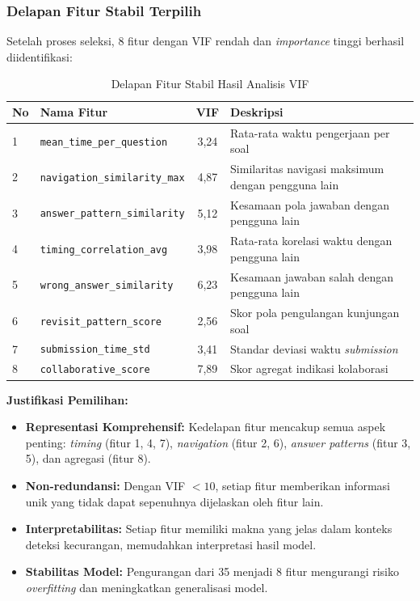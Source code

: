 \subsubsection{Delapan Fitur Stabil Terpilih}
Setelah proses seleksi, 8 fitur dengan VIF rendah dan \textit{importance} tinggi berhasil diidentifikasi:

\begin{table}[htbp]
\centering
\caption{Delapan Fitur Stabil Hasil Analisis VIF}
\label{tabel:fiturStabil}
\begin{tabular}{|l|l|c|p{5cm}|}
\hline
\textbf{No} & \textbf{Nama Fitur} & \textbf{VIF} & \textbf{Deskripsi} \\
\hline
1 & \texttt{mean\_time\_per\_question} & 3,24 & Rata-rata waktu pengerjaan per soal \\
\hline
2 & \texttt{navigation\_similarity\_max} & 4,87 & Similaritas navigasi maksimum dengan pengguna lain \\
\hline
3 & \texttt{answer\_pattern\_similarity} & 5,12 & Kesamaan pola jawaban dengan pengguna lain \\
\hline
4 & \texttt{timing\_correlation\_avg} & 3,98 & Rata-rata korelasi waktu dengan pengguna lain \\
\hline
5 & \texttt{wrong\_answer\_similarity} & 6,23 & Kesamaan jawaban salah dengan pengguna lain \\
\hline
6 & \texttt{revisit\_pattern\_score} & 2,56 & Skor pola pengulangan kunjungan soal \\
\hline
7 & \texttt{submission\_time\_std} & 3,41 & Standar deviasi waktu \textit{submission} \\
\hline
8 & \texttt{collaborative\_score} & 7,89 & Skor agregat indikasi kolaborasi \\
\hline
\end{tabular}
\end{table}

\textbf{Justifikasi Pemilihan:}
\begin{itemize}
    \item \textbf{Representasi Komprehensif:} Kedelapan fitur mencakup semua aspek penting: \textit{timing} (fitur 1, 4, 7), \textit{navigation} (fitur 2, 6), \textit{answer patterns} (fitur 3, 5), dan agregasi (fitur 8).
    \item \textbf{Non-redundansi:} Dengan VIF $< 10$, setiap fitur memberikan informasi unik yang tidak dapat sepenuhnya dijelaskan oleh fitur lain.
    \item \textbf{Interpretabilitas:} Setiap fitur memiliki makna yang jelas dalam konteks deteksi kecurangan, memudahkan interpretasi hasil model.
    \item \textbf{Stabilitas Model:} Pengurangan dari 35 menjadi 8 fitur mengurangi risiko \textit{overfitting} dan meningkatkan generalisasi model.
\end{itemize}

